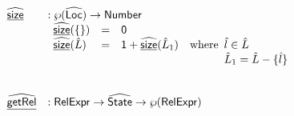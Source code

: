 \[
\begin{array}{ll}
\widehat{\underline{\sf size}} & : \wp(\widehat{\mbox{\textsf{Loc}}}) \rightarrow {\sf Number}\\
& \begin{array}{llll}
  \widehat{\underline{\sf size}}(\{\}) & = & {\sf 0}\\
  \widehat{\underline{\sf size}}( \hat{L} ) & = & {\sf 1} + \widehat{\underline{\sf size}}(\hat{L}_1) & {\rm where}\begin{array}[t]{l} \hat{l} \in \hat{L}\\ \hat{L}_1 = \hat{L} - \{\hat{l}\}\end{array}\\
\end{array}\\
\\\\

\widehat{\underline{\sf getRel}} & : \mbox{\textsf{RelExpr}} \rightarrow \widehat{\mbox{\textsf{State}}} \rightarrow \wp(\mbox{\textsf{RelExpr}})\\

\end{array}\]
